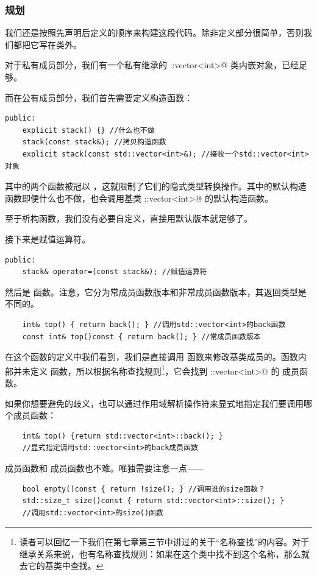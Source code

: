 \subsubsection*{规划}
我们还是按照先声明后定义的顺序来构建这段代码。除非定义部分很简单，否则我们都把它写在类外。\par
对于私有成员部分，我们有一个私有继承的 \lstinline@std::vector<int>@ 类内嵌对象，已经足够。\par
而在公有成员部分，我们首先需要定义构造函数：
\begin{lstlisting}
public:
    explicit stack() {} //什么也不做
    stack(const stack&); //拷贝构造函数
    explicit stack(const std::vector<int>&); //接收一个std::vector<int>对象
\end{lstlisting}
其中的两个函数被冠以 \lstinline@explicit@，这就限制了它们的隐式类型转换操作。其中的默认构造函数即便什么也不做，也会调用基类 \lstinline@std::vector<int>@ 的默认构造函数。\par
至于析构函数，我们没有必要自定义，直接用默认版本就足够了。\par
接下来是赋值运算符。
\begin{lstlisting}
public:
    stack& operator=(const stack&); //赋值运算符
\end{lstlisting}\par
然后是 \lstinline@top@ 函数。注意，它分为常成员函数版本和非常成员函数版本，其返回类型是不同的。
\begin{lstlisting}
    int& top() { return back(); } //调用std::vector<int>的back函数
    const int& top()const { return back(); } //常成员函数版本
\end{lstlisting}
在这个函数的定义中我们看到，我们是直接调用 \lstinline@back@ 函数来修改基类成员的。\lstinline@stack@ 函数内部并未定义 \lstinline@back@ 函数，所以根据名称查找规则\footnote{读者可以回忆一下我们在第七章第三节中讲过的关于``名称查找''的内容。对于继承关系来说，也有名称查找规则：如果在这个类中找不到这个名称，那么就去它的基类中查找。}，它会找到 \lstinline@std::vector<int>@ 的 \lstinline@back@ 成员函数。\par
如果你想要避免的歧义，也可以通过作用域解析操作符来显式地指定我们要调用哪个成员函数：
\begin{lstlisting}
    int& top() {return std::vector<int>::back(); }
    //显式指定调用std::vector<int>的back成员函数
\end{lstlisting}\par
\lstinline@empty@ 成员函数和 \lstinline@size@ 成员函数也不难。唯独需要注意一点——
\begin{lstlisting}
    bool empty()const { return !size(); } //调用谁的size函数？
    std::size_t size()const { return std::vector<int>::size(); }
    //调用std::vector<int>的size()函数
\end{lstlisting}
